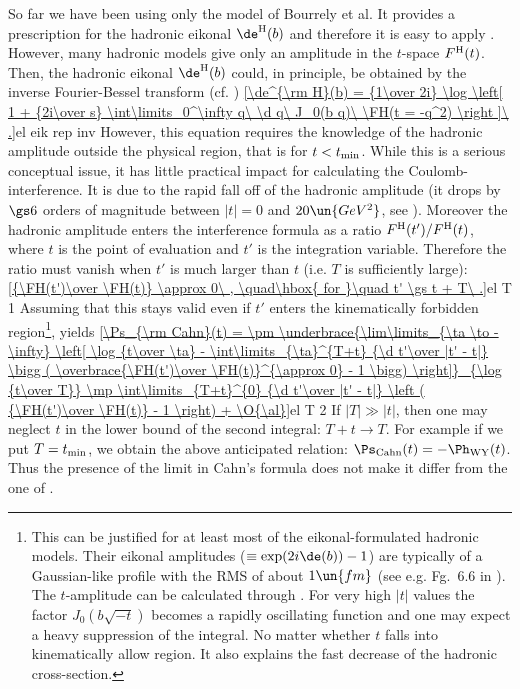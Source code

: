 So far we have been using only the model of Bourrely et al. It provides a prescription for the hadronic eikonal $\de^{\rm H}(b)$ and therefore it is easy to apply . However, many hadronic models give only an amplitude in the $t$-space $F^{\rm H}(t)$. Then, the hadronic eikonal $\de^{\rm H}(b)$ could, in principle, be obtained by the inverse Fourier-Bessel transform (cf. )
\eqref{\de^{\rm H}(b) = {1\over 2i} \log \left[ 1 + {2i\over s} \int\limits_0^\infty q\ \d q\ J_0(b q)\ \FH(t = -q^2)  \right ]\ .}{el eik rep inv}
However, this equation requires the knowledge of the hadronic amplitude outside the physical region, that is for $t < t_{\rm min}$.
While this is a serious conceptual issue, it has little practical impact for calculating the Coulomb-interference. It is due to the rapid fall off of the hadronic amplitude (it drops by $\gs 6$ orders of magnitude between $|t|=0$ and $20\un{GeV^2}$, see ). Moreover the hadronic amplitude enters the interference formula  as a ratio $F^{\rm H}(t') / F^{\rm H}(t)$, where $t$ is the point of evaluation and $t'$ is the integration variable. Therefore the ratio must vanish when $t'$ is much larger than $t$ (i.e. $T$ is sufficiently large):
\eqref{{\FH(t')\over \FH(t)} \approx 0\ , \quad\hbox{ for }\quad t' \gs t + T\ .}{el T 1}
Assuming that this stays valid even if $t'$ enters the kinematically forbidden region\footnote{%
This can be justified for at least most of the eikonal-formulated hadronic models. Their eikonal amplitudes ($\equiv \exp(2i\de(b)) - 1$) are typically of a Gaussian-like profile with the RMS of about $1\un{fm}$ (see e.g. Fg.~6.6 in ). The $t$-amplitude can be calculated through . For very high $|t|$ values the factor $J_0(b\sqrt{-t})$ becomes a rapidly oscillating function and one may expect a heavy suppression of the integral. No matter whether $t$ falls into kinematically allow region. It also explains the fast decrease of the hadronic cross-section. 
},  yields
\eqref{\Ps_{\rm Cahn}(t) =
\pm \underbrace{\lim\limits_{\ta \to -\infty} \left[
	\log {t\over \ta}
	- \int\limits_{\ta}^{T+t} {\d t'\over |t' - t|} \bigg ( \overbrace{\FH(t')\over \FH(t)}^{\approx 0} - 1 \bigg)
\right]}_{\log {t\over T}}
\mp \int\limits_{T+t}^{0} {\d t'\over |t' - t|} \left ( {\FH(t')\over \FH(t)} - 1 \right)
+ \O{\al}}{el T 2}
If $|T| \gg |t|$, then one may neglect $t$ in the lower bound of the second integral: $T+t\rightarrow T$. For example if we put $T=t_{\rm min}$, we obtain the above anticipated relation: $\Ps_{\rm Cahn}(t) = - \Ph_{\rm WY}(t)$. Thus the presence of the limit in Cahn's formula does not make it differ from the one of \WaY.

